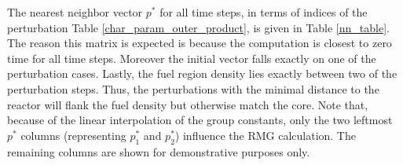 The nearest neighbor vector $p^*$ for all time steps, in terms of indices
of the perturbation Table \ref{char_param_outer_product}, is given in Table \ref{nn_table}.
The reason this matrix is expected is because the computation is closest to zero time for all 
time steps.  Moreover the initial  vector falls exactly on one of the perturbation cases.
Lastly, the fuel region density lies exactly between two of the perturbation steps.  Thus, the 
perturbations with the minimal distance to the reactor will flank the fuel density but otherwise 
match the core.  Note that, because of the linear interpolation of the group constants, only the 
two leftmost $p^*$ columns (representing $p_1^*$ and $p_2^*$) influence the RMG calculation.  The 
remaining columns are shown for demonstrative purposes only.



